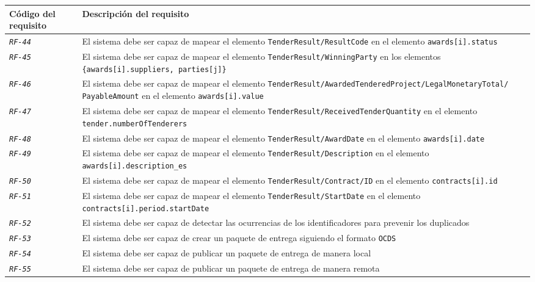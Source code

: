 \begin{longtable}{|| M{3cm} | M{12cm} ||}
                \hline
                    Código del requisito & Descripción del requisito \\
                \hline
                \hline
                    \texttt{\textit{RF-44}} & El sistema debe ser capaz de mapear el elemento \texttt{TenderResult/ResultCode} en el elemento \texttt{awards[i].status} \\
                \hline
                    \texttt{\textit{RF-45}} & El sistema debe ser capaz de mapear el elemento \texttt{TenderResult/WinningParty} en los elementos \texttt{\{awards[i].suppliers, parties[j]\}} \\
                \hline
                    \texttt{\textit{RF-46}} & El sistema debe ser capaz de mapear el elemento \texttt{TenderResult/AwardedTenderedProject/LegalMonetaryTotal/
                    PayableAmount} en el elemento \texttt{awards[i].value} \\
                \hline
                    \texttt{\textit{RF-47}} & El sistema debe ser capaz de mapear el elemento \texttt{TenderResult/ReceivedTenderQuantity} en el elemento \texttt{tender.numberOfTenderers} \\
                \hline
                    \texttt{\textit{RF-48}} & El sistema debe ser capaz de mapear el elemento \texttt{TenderResult/AwardDate} en el elemento \texttt{awards[i].date} \\
                \hline
                    \texttt{\textit{RF-49}} & El sistema debe ser capaz de mapear el elemento \texttt{TenderResult/Description} en el elemento \texttt{awards[i].description\_es} \\
                \hline
                    \texttt{\textit{RF-50}} & El sistema debe ser capaz de mapear el elemento \texttt{TenderResult/Contract/ID} en el elemento \texttt{contracts[i].id} \\
                \hline
                    \texttt{\textit{RF-51}} & El sistema debe ser capaz de mapear el elemento \texttt{TenderResult/StartDate} en el elemento \texttt{contracts[i].period.startDate} \\
                \hline
                    \texttt{\textit{RF-52}} & El sistema debe ser capaz de detectar las ocurrencias de los identificadores para prevenir los duplicados \\
                \hline
                    \texttt{\textit{RF-53}} & El sistema debe ser capaz de crear un paquete de entrega siguiendo el formato \texttt{OCDS} \\
                \hline
                    \texttt{\textit{RF-54}} & El sistema debe ser capaz de publicar un paquete de entrega de manera local \\
                \hline
                    \texttt{\textit{RF-55}} & El sistema debe ser capaz de publicar un paquete de entrega de manera remota \\
                \hline
            \end{longtable}
            \addtocounter{table}{-1}
            
